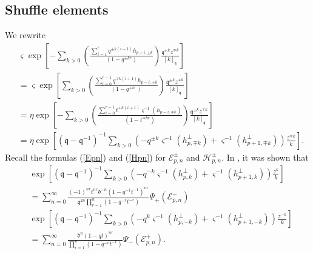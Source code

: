 \documentclass{amsart}
\newcommand{\qqq}{\mathfrak{q}}
\newcommand{\ddd}{\mathfrak{d}}
\theoremstyle{remark}
\numberwithin{thm}{section}
\numberwithin{equation}{section}
\begin{document}
\subsection{Shuffle elements}
We rewrite
\begin{align*}
&\varsigma\exp\left[-\sum_{k>0}\left(\frac{\sum_{i=1}^{r}q^{\pm k(i-1)}h_{p+i,\pm k}}{(1-q^{\pm kr})}\right)\frac{\qqq^{\pm k} z^{\mp k}}{[ k]_{\qqq}} \right]\\
&= 
\varsigma\exp\left[\sum_{k>0}\left(\frac{\sum_{i=0}^{r-1}q^{\mp k(i+1)}h_{p-i,\pm k}}{(1-q^{\mp kr})}\right)\frac{\qqq^{\pm k} z^{\mp k}}{[ k]_{\qqq}} \right]\\
&=\eta\exp\left[-\sum_{k>0}\left(\frac{\sum_{i=0}^{r-1}t^{\mp k(i+1)}\varsigma^{-1}(h_{p-i,\mp k})}{(1-t^{\mp kr})}\right)\frac{\qqq^{\pm k} z^{\mp k}}{[ k]_{\qqq}} \right]\\
&= \eta\exp\left[(\qqq-\qqq^{-1})^{-1} \sum_{k>0}\left(-q^{\pm k}\varsigma^{-1}(h_{p,\mp k}^\perp)+\varsigma^{-1}(h_{p+1,\mp k}^\perp) \right)\frac{z^{\mp k}}{k} \right].
\end{align*}
Recall the formulas (\ref{Epn}) and (\ref{Hpn}) for $\mathcal{E}_{p,n}^\pm$ and $\mathcal{H}_{p,n}^\pm$.
In \cite{Wen}, it was shown that
\begin{align*}
&\exp\left[(\qqq-\qqq^{-1})^{-1} \sum_{k>0}\left(-q^{- k}\varsigma^{-1}(h_{p, k}^\perp)+\varsigma^{-1}(h_{p+1, k}^\perp) \right)\frac{z^{ k}}{k} \right]\\
&= \sum_{n=0}^\infty\frac{(-1)^{nr}t^{nr}\ddd^{-n}\left( 1-q^{-1}t^{-1} \right)^{nr}}{\qqq^{2n}\prod_{r=1}^n\left( 1-q^{-r}t^{-r} \right)}\Psi_+\left( \mathcal{E}_{p,n}^-\right)\\
&\exp\left[(\qqq-\qqq^{-1})^{-1} \sum_{k>0}\left(-q^{ k}\varsigma^{-1}(h_{p,- k}^\perp)+\varsigma^{-1}(h_{p+1,- k}^\perp) \right)\frac{z^{- k}}{k} \right]\\
&= \sum_{n=0}^\infty\frac{\ddd^n\left( 1-qt \right)^{nr}}{\prod_{r=1}^n\left( 1-q^{-r}t^{-r} \right)}\Psi_-\left( \mathcal{E}_{p,n}^+\right).
\end{align*}
\end{document}
